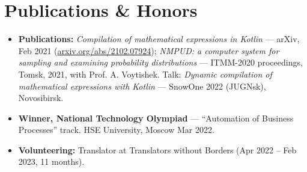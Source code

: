 \documentclass[10pt,a4paper]{article}
\begin{document}
\section*{Publications \& Honors}

\begin{itemize}
  \item \textbf{Publications:} \textit{Compilation of mathematical expressions in Kotlin} --- arXiv, Feb 2021 (\href{https://arxiv.org/abs/2102.07924}{arxiv.org/abs/2102.07924}); \textit{NMPUD: a computer system for sampling and examining probability distributions} --- ITMM-2020 proceedings, Tomsk, 2021, with Prof. A. Voytishek. Talk: \textit{Dynamic compilation of mathematical expressions with Kotlin} --- SnowOne 2022 (JUGNsk), Novosibirsk.
  \item \textbf{Winner, National Technology Olympiad} --- ``Automation of Business Processes'' track. HSE University, Moscow \textbullet{} Mar 2022.
  \item \textbf{Volunteering:} Translator at Translators without Borders (Apr 2022 -- Feb 2023, 11 months).
\end{itemize}
\end{document}
